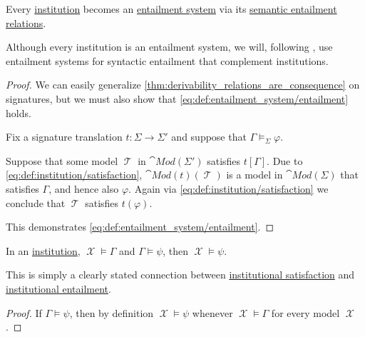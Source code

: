 \begin{corollary}\label{thm:institution_is_entailment_system}
  Every \hyperref[def:institution]{institution} becomes an \hyperref[def:entailment_system]{entailment system} via its \hyperref[def:institutional_entailment]{semantic entailment relations}.
\end{corollary}
\begin{comments}
  \item Although every institution is an entailment system, we will, following \cite{Meseguer1989GeneralLogics}, use entailment systems for syntactic entailment that complement institutions.
\end{comments}
\begin{proof}
  We can easily generalize \cref{thm:derivability_relations_are_consequence} on signatures, but we must also show that \eqref{eq:def:entailment_system/entailment} holds.

  Fix a signature translation \( t: \Sigma \to \Sigma' \) and suppose that \( \Gamma \vDash_\Sigma \varphi \).

  Suppose that some model \( \mscrT \) in \( \cat{Mod}(\Sigma') \) satisfies \( t[\Gamma] \). Due to \eqref{eq:def:institution/satisfaction}, \( \cat{Mod}(t)(\mscrT) \) is a model in \( \cat{Mod}(\Sigma) \) that satisfies \( \Gamma \), and hence also \( \varphi \). Again via \eqref{eq:def:institution/satisfaction} we conclude that \( \mscrT \) satisfies \( t(\varphi) \).

  This demonstrates \eqref{eq:def:entailment_system/entailment}.
\end{proof}

\begin{corollary}\label{thm:institutional_satisfaction_transitivity}
  In an \hyperref[def:institution]{institution}, \( \mscrX \vDash \Gamma \) and \( \Gamma \vDash \psi \), then \( \mscrX \vDash \psi \).
\end{corollary}
\begin{comments}
  \item This is simply a clearly stated connection between \hyperref[def:institutional_satisfaction]{institutional satisfaction} and \hyperref[def:institutional_entailment]{institutional entailment}.
\end{comments}
\begin{proof}
  If \( \Gamma \vDash \psi \), then by definition \( \mscrX \vDash \psi \) whenever \( \mscrX \vDash \Gamma \) for every model \( \mscrX \).
\end{proof}

